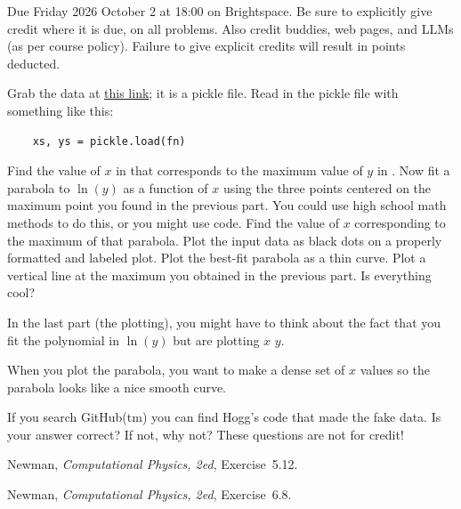 \documentclass[12pt]{article}
\begin{document}
Due Friday 2026 October 2 at 18:00 on Brightspace.
Be sure to explicitly give credit where it is due, on all problems.
Also credit buddies, web pages, and LLMs (as per course policy).
Failure to give explicit credits will result in points deducted.

\begin{problem}
  Grab the data at \href{https://drive.google.com/file/d/1xqEi3mKlQ9unDLYq2SZ6Dx6f6QHJAsG2/view?usp=sharing}{this link}; it is a pickle file.
  Read in the pickle file with something like this:
  \begin{lstlisting}
    xs, ys = pickle.load(fn)\end{lstlisting}
  \subpart Find the value of $x$ in  that corresponds to the maximum value of $y$ in .
  \subpart Now fit a parabola to $\ln(y)$ as a function of $x$ using the three points centered on the maximum point you found in the previous part.
  You could use high school math methods to do this, or you might use  code.
  Find the value of $x$ corresponding to the maximum of that parabola.
  \subpart Plot the input data as black dots on a properly formatted and labeled plot.
  Plot the best-fit parabola as a thin curve.
  Plot a vertical line at the maximum you obtained in the previous part.
  Is everything cool?
\end{problem}

\begin{note}
  In the last part (the plotting), you might have to think about the fact that you fit the polynomial in $\ln(y)$ but are plotting $x$  $y$.
\end{note}

\begin{note}
  When you plot the parabola, you want to make a dense set of $x$ values so the parabola looks like a nice smooth curve.
\end{note}

\begin{note}
  If you search GitHub(tm) you can find Hogg's code that made the fake data.
  Is your answer correct?
  If not, why not?
  These questions are not for credit!
\end{note}

\begin{problem}
  Newman, \textit{Computational Physics, 2ed}, Exercise~5.12.
\end{problem}

\begin{problem}
  Newman, \textit{Computational Physics, 2ed}, Exercise~6.8.
\end{problem}
\end{document}
